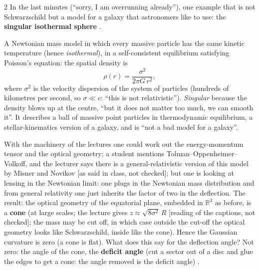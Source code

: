 \begin{paracol}{2}
In the last minutes (``sorry, I am overrunning already''), one example that is not Schwarzschild but a model for a galaxy that astronomers like to use: the \textbf{singular isothermal sphere} .
\begin{definition}\label{def:c17-sis}
A Newtonian mass model in which every massive particle has the same kinetic temperature (hence \emph{isothermal}), in a self-consistent equilibrium satisfying Poisson's equation: the spatial density is
\[
  \rho(r)=\frac{\sigma^2}{2\pi G\,r^2},
\]
where $\sigma^2$ is the velocity dispersion of the system of particles (hundreds of kilometres per second, so $\sigma\ll c$: ``this is not relativistic''). \emph{Singular} because the density blows up at the centre, ``but it does not matter too much, we can smooth it''. It describes a ball of massive point particles in thermodynamic equilibrium, a stellar-kinematics version of a galaxy, and is ``not a bad model for a galaxy''.
\end{definition}
With the machinery of the lectures one could work out the energy-momentum tensor and the optical geometry; a student mentions Tolman--Oppenheimer--Volkoff, and the lecturer says there is a general-relativistic version of this model by Misner and Novikov [as said in class, not checked]; but one is looking at lensing in the Newtonian limit: one plugs in the Newtonian mass distribution and from general relativity one just inherits the factor of two in the deflection. The result: the optical geometry of the equatorial plane, embedded in $\mathbb R^3$ as before, is a \textbf{cone} (at large scales; the lecture gives $z\approx\sqrt{8\sigma^2}\,R$ [reading of the captions, not checked]; the mass may be cut off, in which case outside the cut-off the optical geometry looks like Schwarzschild, inside like the cone). Hence the Gaussian curvature is zero (a cone is flat). What does this say for the deflection angle? Not zero: the angle of the cone, the \textbf{deficit angle} (cut a sector out of a disc and glue the edges to get a cone: the angle removed is the deficit angle) .


\end{paracol}
